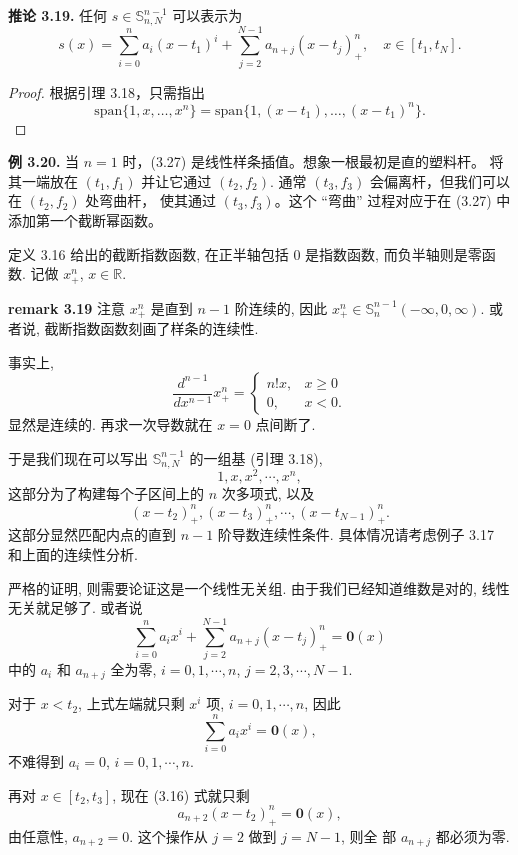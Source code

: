 \documentclass[a4paper]{ctexart}
\begin{document}
{\noindent \textbf{推论 3.19.} 任何 $s \in \mathbb{S}_{n, N}^{n-1}$ 可以表示为
\[
  s(x) = \sum_{i= 0 }^{n} a_i (x - t_1)^i + \sum_{j = 2}^{N - 1} a_{n + j} (x - t_j)_+^n, \quad x \in [t_1, t_N].\tag{3.27}
\]

\begin{proof}
根据引理 3.18，只需指出
  \[
  \text{span}\{1, x, \ldots, x^n\} = \text{span}\{1, (x - t_1), \ldots, (x - t_1)^n\}.
\]  
\end{proof} 

\noindent \textbf{例 3.20.} 当 $n = 1$ 时，(3.27) 是线性样条插值。想象一根最初是直的塑料杆。
将其一端放在 $(t_1, f_1)$ 并让它通过 $(t_2, f_2)$. 通常 $(t_3, f_3)$ 会偏离杆，但我们可以在 $(t_2, f_2)$ 处弯曲杆，
使其通过 $(t_3, f_3)$。这个 ``弯曲'' 过程对应于在 (3.27) 中添加第一个截断幂函数。

定义 3.16 给出的截断指数函数, 在正半轴包括 $0$ 是指数函数, 而负半轴则是零函数. 
记做 $x_+^n$, $x \in \mathbb{R}$.


{\bf remark 3.19} 注意 $x_+^n$ 是直到 $n - 1$ 阶连续的, 因此 $x_+^n
\in \mathbb{S}_{n}^{n - 1}(-\infty, 0, \infty)$. 或者说, 
截断指数函数刻画了样条的连续性. 

事实上, 
$$
\frac{d^{n - 1}}{dx^{n - 1}} x_+^n = \left\{
\begin{array}{ll}
  n! x ,& x \geq 0\\
  0,& x < 0.
\end{array}
\right.
$$
显然是连续的. 再求一次导数就在 $x = 0$ 点间断了. 

于是我们现在可以写出 $\mathbb{S}_{n, N}^{n - 1}$ 的一组基 (引理 3.18),
$$
1, x, x^2, \cdots, x^n,
$$
这部分为了构建每个子区间上的 $n$ 次多项式, 以及
$$
(x - t_2)_+^n, (x - t_3)_+^n, \cdots, (x - t_{N - 1})_+^n.
$$
这部分显然匹配内点的直到 $n - 1$ 阶导数连续性条件. 具体情况请考虑例子 
3.17 和上面的连续性分析.

严格的证明, 则需要论证这是一个线性无关组. 由于我们已经知道维数是对的,
线性无关就足够了. 或者说
$$
\sum_{i = 0}^n a_i x^i + \sum_{j = 2}^{N - 1} a_{n + j}(x - t_j)_+^n = 
\mathbf{0}(x)
$$
中的 $a_i$ 和 $a_{n + j}$ 全为零, $i = 0, 1, \cdots, n$, $j = 2, 3,
\cdots, N - 1$.

对于 $x < t_2$, 上式左端就只剩 $x^i$ 项, $i = 0, 1, \cdots, n$, 因此
$$
\sum_{i = 0}^n a_i x^i = \mathbf{0}(x), 
$$
不难得到 $a_i = 0$, $i = 0, 1, \cdots, n$.

再对 $x \in [t_2, t_3]$, 现在 (3.16) 式就只剩
$$
a_{n + 2}(x - t_2)_+^n = \mathbf{0}(x),
$$
由任意性, $a_{n + 2} = 0$. 这个操作从 $j = 2$ 做到 $j = N - 1$, 则全
部 $a_{n + j}$ 都必须为零.

}
\end{document}
